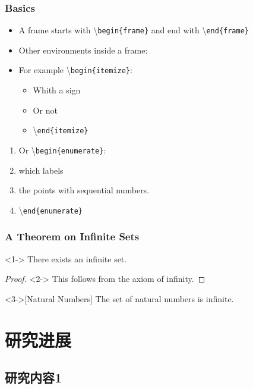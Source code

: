 \documentclass[10pt,aspectratio=169]{beamer}
\begin{document}
\begin{frame} %

  \frametitle{Basics}
  \begin{itemize}
  \item A frame starts with \textbackslash\texttt{begin\{frame\}}
    and end with \textbackslash\texttt{end\{frame\}}
  \item  Other environments inside a frame:
   \item For example \textbackslash\texttt{begin\{itemize\}}:
     \begin{itemize}
\item Whith a sign
\item[] Or not
\item \textbackslash\texttt{end\{itemize\}}
     \end{itemize}
   \end{itemize}
   \begin{enumerate}
\item Or \textbackslash\texttt{begin\{enumerate\}}:
\item which labels
\item the points with sequential numbers.
\item \textbackslash\texttt{end\{enumerate\}}
    \end{enumerate}
\end{frame}






\begin{frame}
	\frametitle{A Theorem on Infinite Sets}
	\begin{theorem}<1->
		There exists an infinite set.
	\end{theorem}
	\begin{proof}<2->
		This follows from the axiom of infinity.
	\end{proof}
	\begin{example}<3->[Natural Numbers]
		The set of natural numbers is infinite.
	\end{example}
\end{frame}







\section{研究进展}
\subsection{研究内容1}
\end{document}
